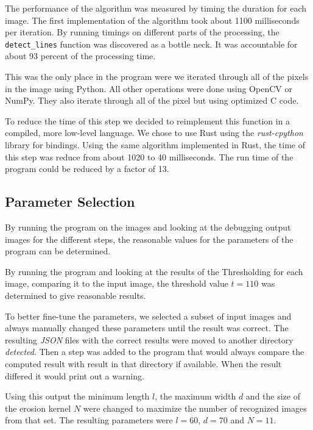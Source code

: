 The performance of the algorithm was measured by timing the duration for each
image. The first implementation of the algorithm took about 1100 milliseconds per
iteration. By running timings on different parts of the processing, the
\texttt{detect\_lines} function was discovered as a bottle neck. It was
accountable for about 93 percent of the processing time.

This was the only place in the program were we iterated through all of the pixels
in the image using Python. All other operations were done using OpenCV or NumPy.
They also iterate through all of the pixel but using optimized C code.

To reduce the time of this step we decided to reimplement this function in a
compiled, more low-level language. We chose to use Rust using the \textit{rust-cpython}
library for bindings. Using the same algorithm implemented in Rust, the time of
this step was reduce from about 1020 to 40 milliseconds. The run time of the
program could be reduced by a factor of 13.

\subsection{Parameter Selection} \label{parameter}

By running the program on the images and looking at the debugging output images
for the different steps, the reasonable values for the parameters of the program
can be determined.

By running the program and looking at the results of the Thresholding for each
image, comparing it to the input image, the threshold value $t = 110$ was
determined to give reasonable results.

To better fine-tune the parameters, we selected a subset of input images and
always manually changed these parameters until the result was correct. The
resulting \textit{JSON} files with the correct results were moved to another
directory \textit{detected}. Then a step was added to the program that would
always compare the computed result with result in that directory if available.
When the result differed it would print out a warning.

Using this output the minimum length $l$, the maximum width $d$ and the size of
the erosion kernel $N$ were changed to maximize the number of recognized images
from that set. The resulting parameters were $l = 60$, $d = 70$ and $N =11$.
